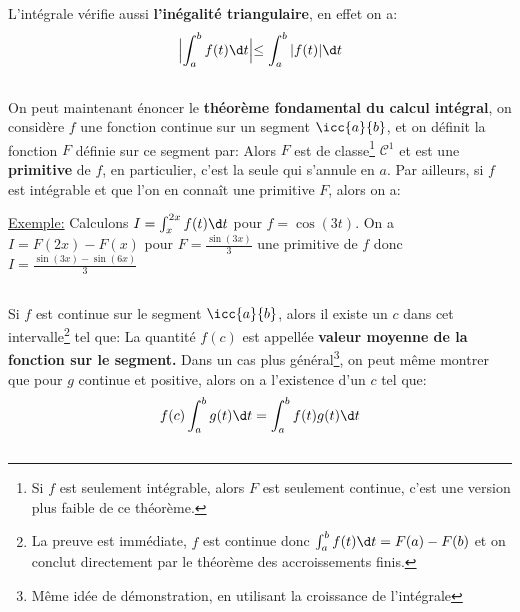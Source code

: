 L'intégrale vérifie aussi \textbf{l'inégalité triangulaire}, en effet on a:
\[ 
   \Bigl| \int_{a}^{b} f(t) \d t \Bigl| \leq \int_{a}^{b} |f(t)| \d t 
\]
  

\subsection*{}

On peut maintenant énoncer le \textbf{théorème fondamental du calcul intégral}, on considère \(f\) une fonction continue sur un segment \(\icc{a}{b}\), et on définit la fonction \(F\) définie sur ce segment par:
Alors \(F\) est de classe\footnote[4]{Si \(f\) est seulement intégrable, alors \(F\) est seulement continue, c'est une version plus faible de ce théorème.} \(\mathscr{C}^1\) et est une \textbf{primitive} de \(f\), en particulier, c'est la seule qui s'annule en \(a\).\+
Par ailleurs, si \(f\) est intégrable et que l'on en connaît une primitive \(F\), alors on a:

\underline{Exemple:} Calculons \(I = \int_{x}^{2x} f(t) \d t\) pour \(f = \cos(3t)\). On a \(I = F(2x) - F(x)\) pour \(F = \frac{\sin(3x)}{3}\) une primitive de \(f\) donc \(I = \frac{\sin(3x) - \sin(6x)}{3}\)

\subsection*{}
Si \(f\) est continue sur le segment \(\icc{a}{b}\), alors il existe un \(c\) dans cet intervalle\footnote[1]{La preuve est immédiate, \(f\) est continue donc \(\int_{a}^{b} f(t) \d t = F(a) - F(b)\) et on conclut directement par le théorème des accroissements finis.} tel que:
La quantité \(f(c)\) est appellée \textbf{valeur moyenne de la fonction sur le segment.}
Dans un cas plus général\footnote[2]{Même idée de démonstration, en utilisant la croissance de l'intégrale}, on peut même montrer que pour \(g\) continue et positive, alors on a l'existence d'un \(c\) tel que:
\[
   f(c)\int_{a}^{b} g(t) \d t = \int_{a}^{b} f(t)g(t) \d t
\]

\subsection*{}

